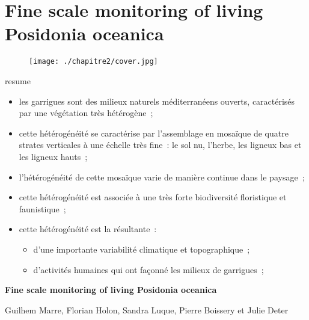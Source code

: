 \chapter{Fine scale monitoring of living Posidonia oceanica} \label{chapitre2-herbiers}

\pagestyle{main}
\begin{figure}[H] 
	\begin{center}
	\texttt{[image: ./chapitre2/cover.jpg]}
    \end{center}
\end{figure}

\begin{colbox}{resume}
  \vspace{-2pt}
{\color{textresume}\small
\begin{itemize}[leftmargin=0in]\itemsep3pt
\item les garrigues sont des milieux naturels méditerranéens ouverts, caractérisés par une végétation très hétérogène~;
\item cette hétérogénéité se caractérise par l'assemblage en mosaïque de quatre strates verticales à une échelle très fine~: le sol nu, l'herbe, les ligneux bas et les ligneux hauts~;
\item l'hétérogénéité de cette mosaïque varie de manière continue dans le paysage~;
\item cette hétérogénéité est associée à une très forte biodiversité floristique et faunistique~;
\item cette hétérogénéité est la résultante~:
\begin{itemize}
  \item d'une importante variabilité climatique et topographique~;
  \item d'activités humaines qui ont façonné les milieux de garrigues~;
\end{itemize}
\end{itemize}
}
\vspace{-2pt}
\end{colbox}

\clearpage

\noindent\textbf{Fine scale monitoring of living Posidonia oceanica}

\noindent Guilhem Marre, Florian Holon, Sandra Luque, Pierre Boissery et Julie Deter

